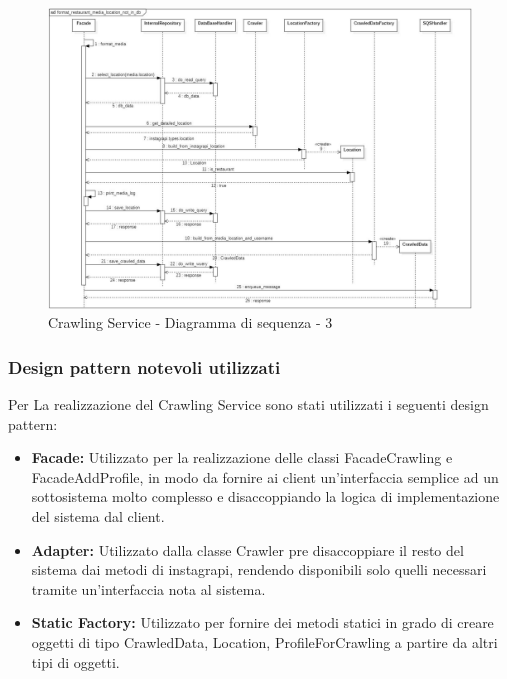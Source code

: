 \begin{figure}[h]
    \centering
    \includegraphics[scale=0.45]{Contenuto/Immagini/seq3-CS.JPG}
    \caption{Crawling Service - Diagramma di sequenza - 3}
\end{figure}

\subsubsection{Design pattern notevoli utilizzati}
Per La realizzazione del Crawling Service sono stati utilizzati i seguenti design pattern:
\begin{itemize}
    \item \textbf{Facade:} Utilizzato per la realizzazione delle classi FacadeCrawling e FacadeAddProfile, in modo da fornire ai client un'interfaccia semplice ad un sottosistema molto complesso e disaccoppiando la logica di implementazione del sistema dal client.
    \item \textbf{Adapter:} Utilizzato dalla classe Crawler pre disaccoppiare il resto del sistema dai metodi di instagrapi, rendendo disponibili solo quelli necessari tramite un'interfaccia nota al sistema.
    \item \textbf{Static Factory:} Utilizzato per fornire dei metodi statici in grado di creare oggetti di tipo CrawledData, Location, ProfileForCrawling a partire da altri tipi di oggetti.
\end{itemize}

